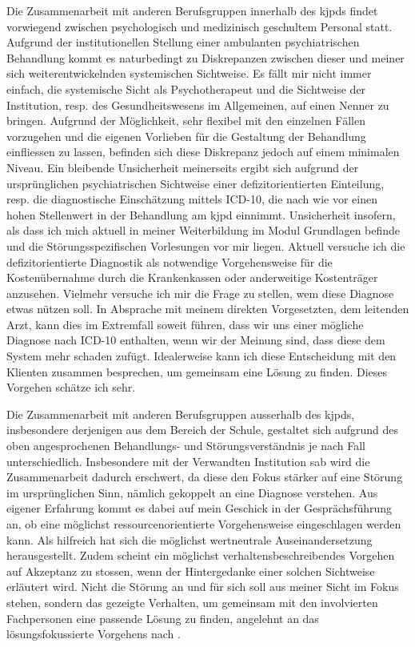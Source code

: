 Die Zusammenarbeit mit anderen Berufsgruppen innerhalb des \ac{kjpd}s findet vorwiegend zwischen psychologisch und medizinisch geschultem Personal statt. Aufgrund der institutionellen Stellung einer ambulanten psychiatrischen Behandlung kommt es naturbedingt zu Diskrepanzen zwischen dieser und meiner sich weiterentwickelnden systemischen Sichtweise. Es fällt mir nicht immer einfach, die systemische Sicht als Psychotherapeut und die Sichtweise der Institution, resp. des Gesundheitswesens im Allgemeinen, auf einen Nenner zu bringen. Aufgrund der Möglichkeit, sehr flexibel mit den einzelnen Fällen vorzugehen und die eigenen Vorlieben für die Gestaltung der Behandlung einfliessen zu lassen, befinden sich diese Diskrepanz jedoch auf einem minimalen Niveau. Ein bleibende  Unsicherheit meinerseits ergibt sich aufgrund der ursprünglichen psychiatrischen Sichtweise einer defizitorientierten Einteilung, resp. die diagnostische Einschätzung mittels  ICD-10, die nach wie vor einen hohen Stellenwert in der Behandlung am \ac{kjpd} einnimmt. Unsicherheit insofern, als dass ich mich aktuell in meiner Weiterbildung im Modul Grundlagen befinde und die Störungsspezifischen Vorlesungen vor mir liegen. Aktuell versuche ich die defizitorientierte Diagnostik als notwendige Vorgehensweise für die Kostenübernahme durch die Krankenkassen oder anderweitige Kostenträger anzusehen. Vielmehr versuche ich mir die Frage zu stellen, wem diese Diagnose etwas nützen soll. In Absprache mit meinem direkten Vorgesetzten, dem leitenden Arzt, kann dies im Extremfall soweit führen, dass wir uns einer mögliche Diagnose nach ICD-10 enthalten, wenn wir der Meinung sind, dass diese dem System mehr schaden zufügt. Idealerweise kann ich diese Entscheidung mit den Klienten zusammen besprechen, um gemeinsam eine Lösung zu finden. Dieses Vorgehen schätze ich sehr.

Die Zusammenarbeit mit anderen Berufsgruppen ausserhalb des \ac{kjpd}s, insbesondere derjenigen aus dem Bereich der Schule, gestaltet sich aufgrund des oben angesprochenen Behandlungs- und Störungsverständnis je nach Fall unterschiedlich. Insbesondere mit der Verwandten Institution \ac{sab} wird die Zusammenarbeit dadurch erschwert, da diese den Fokus stärker auf eine Störung im ursprünglichen Sinn, nämlich gekoppelt an eine Diagnose verstehen. Aus eigener Erfahrung kommt es dabei auf mein Geschick in der Gesprächsführung an, ob eine möglichst ressourcenorientierte Vorgehensweise eingeschlagen werden kann. Als hilfreich hat sich die möglichst wertneutrale Auseinandersetzung herausgestellt. Zudem scheint ein möglichst verhaltensbeschreibendes Vorgehen auf Akzeptanz zu stossen, wenn der Hintergedanke einer solchen Sichtweise erläutert wird. Nicht die Störung an und für sich soll aus meiner Sicht im Fokus stehen, sondern das gezeigte Verhalten, um gemeinsam mit den involvierten Fachpersonen eine passende Lösung zu finden, angelehnt an das lösungsfokussierte Vorgehens nach . 
 
